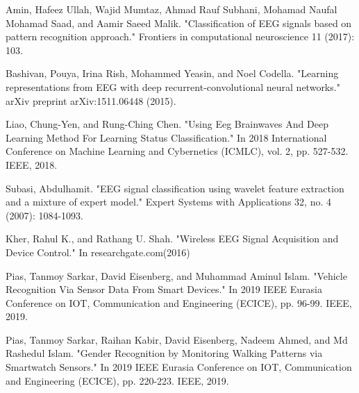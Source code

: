 \documentclass[conference]{IEEEtran}
\begin{document}
\begin{thebibliography}{00}
 Amin, Hafeez Ullah, Wajid Mumtaz, Ahmad Rauf Subhani, Mohamad Naufal Mohamad Saad, and Aamir Saeed Malik. "Classification of EEG signals based on pattern recognition approach." Frontiers in computational neuroscience 11 (2017): 103.

 Bashivan, Pouya, Irina Rish, Mohammed Yeasin, and Noel Codella. "Learning representations from EEG with deep recurrent-convolutional neural networks." arXiv preprint arXiv:1511.06448 (2015).

 Liao, Chung-Yen, and Rung-Ching Chen. "Using Eeg Brainwaves And Deep Learning Method For Learning Status Classification." In 2018 International Conference on Machine Learning and Cybernetics (ICMLC), vol. 2, pp. 527-532. IEEE, 2018.

 Subasi, Abdulhamit. "EEG signal classification using wavelet feature extraction and a mixture of expert model." Expert Systems with Applications 32, no. 4 (2007): 1084-1093.

 Kher, Rahul K., and Rathang U. Shah. "Wireless EEG Signal Acquisition and Device Control." In researchgate.com(2016)

 Pias, Tanmoy Sarkar, David Eisenberg, and Muhammad Aminul Islam. "Vehicle Recognition Via Sensor Data From Smart Devices." In 2019 IEEE Eurasia Conference on IOT, Communication and Engineering (ECICE), pp. 96-99. IEEE, 2019.

 Pias, Tanmoy Sarkar, Raihan Kabir, David Eisenberg, Nadeem Ahmed, and Md Rashedul Islam. "Gender Recognition by Monitoring Walking Patterns via Smartwatch Sensors." In 2019 IEEE Eurasia Conference on IOT, Communication and Engineering (ECICE), pp. 220-223. IEEE, 2019.

\end{thebibliography}
\end{document}
